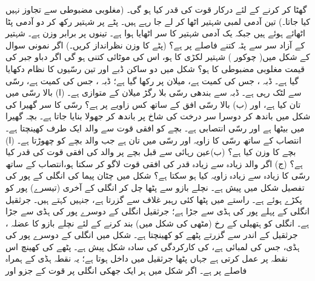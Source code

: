  گھٹا کر  کرنے کے لئے درکار قوت کی قدر کیا ہو گی۔ (مغلوبی مضبوطی سے تجاوز نہیں کیا جاتا۔)
تین آدمی  لمبی شہتیر اٹھا کر لے جا رہے ہیں۔ پٹے پر شہتیر رکھ کر دو آدمی  پٹا اٹھائے ہوئے  ہیں جبکہ  یک آدمی شہتیر کا سر   اٹھایا ہوا ہے۔ تینوں پر برابر وزن ہے۔ شہتیر کے آزاد سر سے پٹہ کتنے فاصلے پر ہے؟ (پٹے کا وزن نظرانداز کریں۔)
اگر نمونی سوال  کے شکل  میں( چوکور ) شہتیر   لکڑی  کا ہو، اس کی موٹائی کتنی ہو گی اگر دباو جبر کی قیمت مغلوبی مضبوطی کا  ہو؟
شکل  میں دو ساکن  ڈبے  اور تین رسّیوں  کا نظام دکھایا گیا ہے۔ ڈبہ  ، جس کی کمیت   ہے،  میلان پر رکھا گیا ہے؛ ڈبہ  ، جس کی کمیت  ہے، رسّی سے لٹک رہی ہے۔ ڈبہ  سے بندھی رسّی بلا رگڑ میلان کے متوازی ہے۔ (ا)  بالا رسّی میں تان کیا ہے، اور (ب)  بالا رسّی افق کے ساتھ کس زاویے پر ہے؟
رسّی  کا  سر گھیرا کی شکل میں باندھ کر دوسرا سر درخت کی شاخ پر باندھ کر جھولا بنایا جاتا ہے۔ بچہ گھیرا میں بیٹھا ہے اور رسّی انتصابی ہے۔ بچے کو افقی قوت سے  والد ایک طرف کھینچتا ہے۔انتصاب کے ساتھ رسّی  کا زاویہ  اور رسّی میں تان  ہے جب والد بچے کو چھوڑتا ہے۔ (ا) بچے کا وزن کیا ہے؟ (ب)عین   رہائی  سے قبل بچے پر والد کی افقی قوت کی قدر کیا ہے؟ (ج)  اگر والد زیادہ سے زیادہ  قدر کی افقی قوت لاگو کر سکتا ہو،انتصاب کے ساتھ  رسّی  کا زیادہ سے زیادہ زاویہ کیا ہو سکتا ہے؟
شکل  میں  چٹان پیما   کی  انگلی کے پور کی تفصیل  شکل  میں پیش ہے۔ نچلے بازو سے  پٹھا  چل کر  انگلی کے آخری (تیسرے) پور کو پکڑے ہوئے ہے۔ راستے میں پٹھا کئی رہبر  غلاف  سے گزرتا ہے، جنہیں  کہتے ہیں۔ جرثقیل  انگلی  کے پہلے پور  کی ہڈی سے جڑا ہے؛ جرثقیل  انگلی کے دوسرے پور  کی ہڈی سے جڑا ہے۔ انگلی کو   ہتھیلی  کے رخ  (مٹھی کی شکل میں)  بند کرنے کے لئے نچلے بازو کا عضلہ ،  جرثقیل  کے اندر  سے گزرتے پٹھے کو کھینچتا ہے۔ شکل  میں  انگلی کے دوسرے پور کی ہڈی، جس کی لمبائی  ہے،  کی  کارکردگی کی سادہ   شکل  پیش ہے۔ پٹھے  کی کھینچ   اس نقطہ پر عمل کرتی ہے جہاں  پٹھا جرثقیل  میں داخل ہوتا ہے؛ یہ نقطہ ہڈی کے ہمراہ  فاصلے پر ہے۔ اگر شکل  میں  ہر ایک  جھکی انگلی  پر قوت کے جزو  اور
